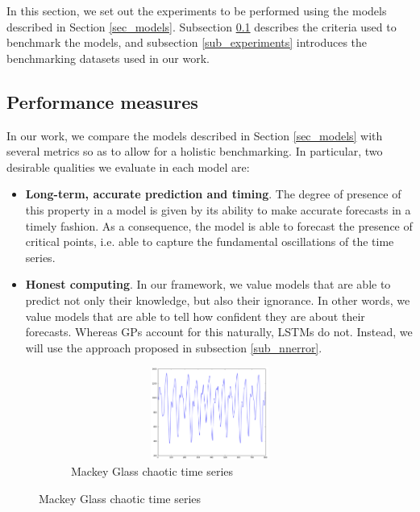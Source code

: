 \documentclass[pdftex,10pt,a4paper,journal]{article}
\theoremstyle{definition}
\theoremstyle{remark}
\begin{document}
\begin{multicols}{2}
In this section, we set out the experiments to be performed using the models described in Section \ref{sec_models}. Subsection \ref{sub_measures} describes the criteria used to benchmark the models, and subsection \ref{sub_experiments} introduces the benchmarking datasets used in our work.

\subsection{Performance measures} \label{sub_measures}
In our work, we compare the models described in Section \ref{sec_models} with several metrics so as to allow for a holistic benchmarking. In particular, two desirable qualities we evaluate in each model are:
\begin{itemize}
    \item \textbf{Long-term, accurate prediction and timing}. The degree of presence of this property in a model is given by its ability to make accurate forecasts in a timely fashion. As a consequence, the model is able to forecast the presence of critical points, i.e. able to capture the fundamental oscillations of the time series.
    \item \textbf{Honest computing}. In our framework, we value models that are able to predict not only their knowledge, but also their ignorance. In other words, we value models that are able to tell how confident they are about their forecasts. Whereas GPs account for this naturally, LSTMs do not. Instead, we will use the approach proposed in subsection \ref{sub_nnerror}.
\end{itemize}

\begin{figure}[ht] 
    \centering
    \begin{subfigure}[t]{0.5\textwidth}
        \centering
        \includegraphics[height=1.2in, width=3.8in]{figs/mg.png}
        \caption{Mackey Glass chaotic time series}
    \end{subfigure}%
    

\end{figure}
\end{multicols}
\end{document}
